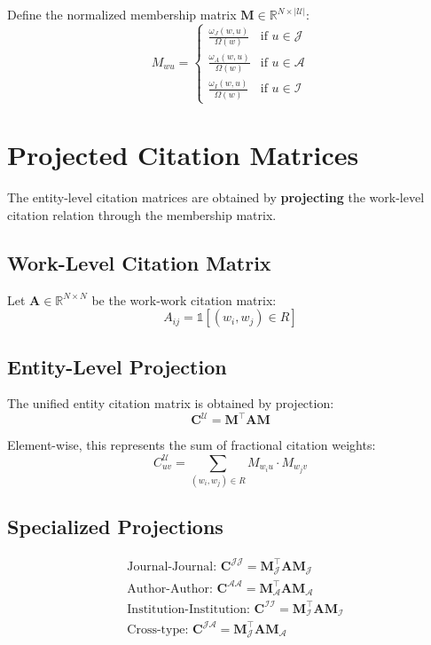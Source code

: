 \documentclass[12pt]{article}
\begin{document}
Define the normalized membership matrix $\mathbf{M} \in \mathbb{R}^{N \times |\mathcal{U}|}$:
\[
M_{wu} = 
\begin{cases}
	\frac{\omega_J(w, u)}{\Omega(w)} & \text{if } u \in \mathcal{J} \\
	\frac{\omega_A(w, u)}{\Omega(w)} & \text{if } u \in \mathcal{A} \\
	\frac{\omega_I(w, u)}{\Omega(w)} & \text{if } u \in \mathcal{I}
\end{cases}
\]

\section{Projected Citation Matrices}

The entity-level citation matrices are obtained by \textbf{projecting} the work-level citation relation through the membership matrix.

\subsection{Work-Level Citation Matrix}

Let $\mathbf{A} \in \mathbb{R}^{N \times N}$ be the work-work citation matrix:
\[
A_{ij} = \mathbb{1}[(w_i, w_j) \in R]
\]

\subsection{Entity-Level Projection}

The unified entity citation matrix is obtained by projection:
\[
\mathbf{C}^{\mathcal{U}} = \mathbf{M}^\top \mathbf{A} \mathbf{M}
\]

Element-wise, this represents the sum of fractional citation weights:
\[
C^{\mathcal{U}}_{uv} = \sum_{(w_i, w_j) \in R} M_{w_i u} \cdot M_{w_j v}
\]

\subsection{Specialized Projections}

\begin{align*}
	&\text{Journal-Journal: } \mathbf{C}^{\mathcal{JJ}} = \mathbf{M}_\mathcal{J}^\top \mathbf{A} \mathbf{M}_\mathcal{J} \\
	&\text{Author-Author: } \mathbf{C}^{\mathcal{AA}} = \mathbf{M}_\mathcal{A}^\top \mathbf{A} \mathbf{M}_\mathcal{A} \\
	&\text{Institution-Institution: } \mathbf{C}^{\mathcal{II}} = \mathbf{M}_\mathcal{I}^\top \mathbf{A} \mathbf{M}_\mathcal{I} \\
	&\text{Cross-type: } \mathbf{C}^{\mathcal{JA}} = \mathbf{M}_\mathcal{J}^\top \mathbf{A} \mathbf{M}_\mathcal{A}
\end{align*}
\end{document}
